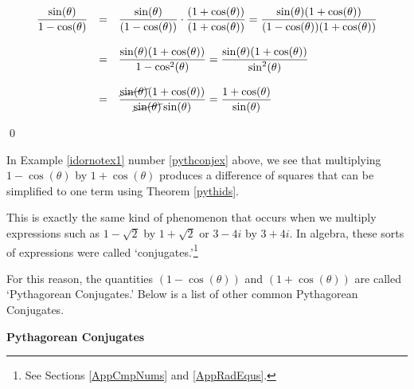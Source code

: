 \documentclass{ximera}
\begin{document}
\begin{example}
\begin{enumerate}
\[ \begin{array}{rcl}


\dfrac{\sin(\theta)}{1 - \cos(\theta)} & = & \dfrac{\sin(\theta)}{(1 - \cos(\theta))} \cdot \dfrac{(1 + \cos(\theta))}{(1 + \cos(\theta))} = \dfrac{\sin(\theta)(1 + \cos(\theta))}{(1 - \cos(\theta))(1 + \cos(\theta))} \\ [.25in]
& = & \dfrac{\sin(\theta)(1 + \cos(\theta))}{1 - \cos^{2}(\theta)} = \dfrac{\sin(\theta)(1 + \cos(\theta))}{\sin^{2}(\theta)} \\ [.25in]
& = & \dfrac{\cancel{\sin(\theta)}(1 + \cos(\theta))}{\cancel{\sin(\theta)}\sin(\theta)} = \dfrac{1 + \cos(\theta)}{\sin(\theta)} \end{array} \]

\vspace{-.1in} \qed

\end{enumerate}

\end{example}

In Example \ref{idornotex1} number \ref{pythconjex} above,  we see that multiplying  $1-\cos(\theta)$ by $1+\cos(\theta)$ produces a difference of squares that can be simplified to one term using Theorem \ref{pythids}.  

\smallskip

This is exactly the same kind of phenomenon that occurs when we multiply expressions such as $1 - \sqrt{2}$ by $1+\sqrt{2}$ or $3 - 4i$ by $3+4i$. In algebra, these sorts of expressions were called `conjugates.'\footnote{See Sections  \ref{AppCmpNums} and \ref{AppRadEqus}.}  

\smallskip

For this reason, the quantities $(1-\cos(\theta))$ and $(1+\cos(\theta))$ are called `Pythagorean Conjugates.'  Below is a list of other common Pythagorean Conjugates.  

\smallskip

\label{PythagoreanConjugates}
\smallskip

\smallskip

\centerline{\textbf{Pythagorean Conjugates}}  
\end{document}
